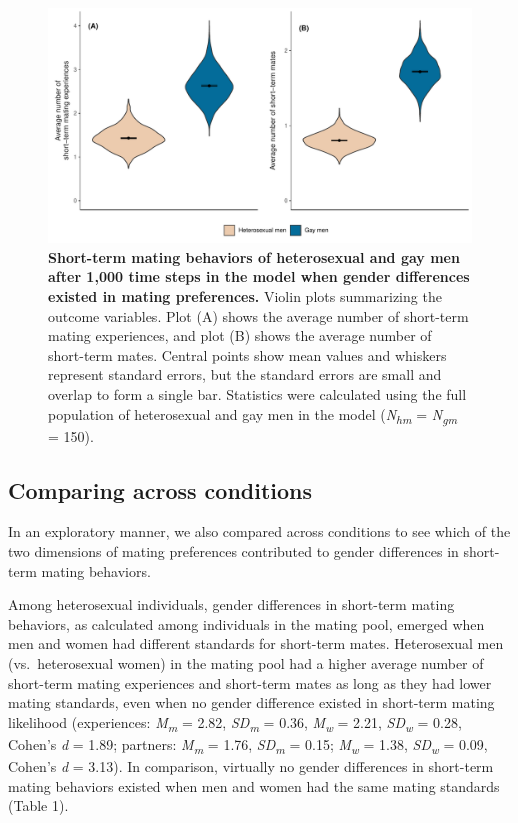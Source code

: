 \documentclass[
  11pt,
]{article}
\begin{document}
\begin{figure}[h]
  \centering
  \includegraphics[width=0.8\columnwidth]{figures/fig2_hetero_vs_gay_men.pdf}
  \caption{\textbf{Short-term mating behaviors of heterosexual and gay men after 1,000 time steps in the model when gender differences existed in mating preferences.} Violin plots summarizing the outcome variables. Plot (A) shows the average number of short-term mating experiences, and plot (B) shows the average number of short-term mates. Central points show mean values and whiskers represent standard errors, but the standard errors are small and overlap to form a single bar. Statistics were calculated using the full population of heterosexual and gay men in the model (\textit{N\textsubscript{hm}} = \textit{N\textsubscript{gm}} = 150).}
\end{figure}

\hypertarget{comparing-across-conditions}{%
\subsection{Comparing across
conditions}\label{comparing-across-conditions}}

In an exploratory manner, we also compared across conditions to see
which of the two dimensions of mating preferences contributed to gender
differences in short-term mating behaviors.

Among heterosexual individuals, gender differences in short-term mating
behaviors, as calculated among individuals in the mating pool, emerged
when men and women had different standards for short-term mates.
Heterosexual men (vs.~heterosexual women) in the mating pool had a
higher average number of short-term mating experiences and short-term
mates as long as they had lower mating standards, even when no gender
difference existed in short-term mating likelihood (experiences:
\emph{M\textsubscript{m}} = 2.82, \emph{SD\textsubscript{m}} = 0.36,
\emph{M\textsubscript{w}} = 2.21, \emph{SD\textsubscript{w}} = 0.28,
Cohen's \emph{d} = 1.89; partners: \emph{M\textsubscript{m}} = 1.76,
\emph{SD\textsubscript{m}} = 0.15; \emph{M\textsubscript{w}} = 1.38,
\emph{SD\textsubscript{w}} = 0.09, Cohen's \emph{d} = 3.13). In
comparison, virtually no gender differences in short-term mating
behaviors existed when men and women had the same mating standards
(Table 1).
\end{document}
